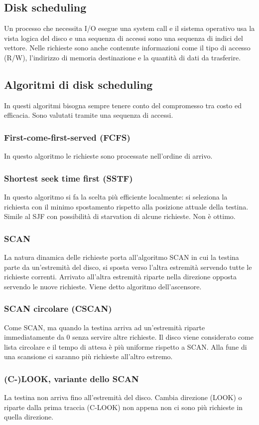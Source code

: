 \subsection{Disk scheduling}
Un processo che necessita I/O esegue una system call e il sistema operativo usa la vista logica del disco e una sequenza di accessi sono una sequenza di indici del vettore. Nelle 
richieste sono anche contenute informazioni come il tipo di accesso (R/W), l'indirizzo di memoria destinazione e la quantit\`a di dati da trasferire. 
\subsection{Algoritmi di disk scheduling}
In questi algoritmi bisogna sempre tenere conto del compromesso tra costo ed efficacia. Sono valutati tramite una sequenza di accessi. 
\subsubsection{First-come-first-served (FCFS)}
In questo algoritmo le richieste sono processate nell'ordine di arrivo. 
\subsubsection{Shortest seek time first (SSTF)}
In questo algoritmo si fa la scelta pi\`u efficiente localmente: si seleziona la richiesta con il minimo spostamento rispetto alla posizione attuale della testina. Simile al SJF con
possibilit\`a di starvation di alcune richieste. Non \`e ottimo. 
\subsubsection{SCAN}
La natura dinamica delle richieste porta all'algoritmo SCAN in cui la testina parte da un'estremit\`a del disco, si sposta verso l'altra estremit\`a servendo tutte le richieste 
correnti. Arrivato all'altra estremit\`a riparte nella direzione opposta servendo le nuove richieste. Viene detto algoritmo dell'ascensore. 
\subsubsection{SCAN circolare (CSCAN)}
Come SCAN, ma quando la testina arriva ad un'estremit\`a riparte immediatamente da $0$ senza servire altre richieste. Il disco viene considerato come lista circolare e il tempo di 
attesa \`e pi\`u uniforme rispetto a SCAN. Alla fune di una scansione ci saranno pi\`u richieste all'altro estremo. 
\subsubsection{(C-)LOOK, variante dello SCAN}
La testina non arriva fino all'estremit\`a del disco. Cambia direzione (LOOK) o riparte dalla prima traccia (C-LOOK) non appena non ci sono pi\`u richieste in quella direzione.

